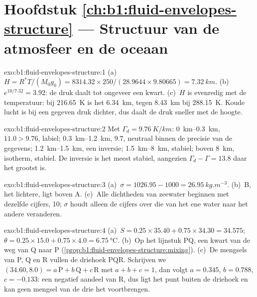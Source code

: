 \section*{Hoofdstuk \ref{ch:b1:fluid-envelopes-structure} --- Structuur van de atmosfeer en de oceaan}

\begin{solution}{exo:b1:fluid-envelopes-structure:1}
(a)~$H = R^*T/(M_0 g_0) = 8314.32 \times 250/(28.9644 \times 9.80665) =
\qty{7.32}{km}$. (b)~$e^{10/7.32} = 3.92$: de druk daalt tot ongeveer een kwart.
(c)~$H$ is evenredig met de temperatuur: bij \qty{216.65}{K} is het
\qty{6.34}{km}, tegen \qty{8.43}{km} bij \qty{288.15}{K}. Koude lucht is bij een gegeven
druk dichter, dus daalt de druk sneller met de hoogte.
\end{solution}

\begin{solution}{exo:b1:fluid-envelopes-structure:2}
Met $\Gamma_d = \qty{9.76}{K/km}$: \qtyrange{0}{0.3}{km}, $11.0 > 9.76$,
labiel; \qtyrange{0.3}{1.2}{km}, $9.7$, neutraal binnen de precisie van de
gegevens; \qtyrange{1.2}{1.5}{km}, een inversie; \qtyrange{1.5}{8}{km}, stabiel;
boven \qty{8}{km}, isotherm, stabiel. De inversie is het meest stabiel, aangezien
$\Gamma_d - \Gamma = 13.8$ daar het grootst is.
\end{solution}

\begin{solution}{exo:b1:fluid-envelopes-structure:3}
(a)~$\sigma = 1026.95 - 1000 = \qty{26.95}{kg.m^{-3}}$. (b)~B, het lichtere, ligt
boven A. (c)~Alle dichtheden van zeewater beginnen met dezelfde cijfers, 10; $\sigma$ houdt
alleen de cijfers over die van het ene water naar het andere veranderen.
\end{solution}

\begin{solution}{exo:b1:fluid-envelopes-structure:4}
(a)~$S = 0.25 \times 35.40 + 0.75 \times 34.30 = 34.575$; $\theta = 0.25 \times
15.0 + 0.75 \times 4.0 = \qty{6.75}{\celsius}$. (b)~Op het lijnstuk PQ, een kwart van
de weg van Q naar P (\cref{prop:b1:fluid-envelopes-structure:mixing}).
(c)~De mengsels van P, Q en R vullen de driehoek PQR. Schrijven we
$(34.60, 8.0) = a\,\mathrm P + b\,\mathrm Q + c\,\mathrm R$ met $a + b + c = 1$,
dan volgt $a = 0.345$, $b = 0.788$, $c = -0.133$: een negatief aandeel van R, dus ligt het
punt buiten de driehoek en kan geen mengsel van de drie het voortbrengen.
\end{solution}

